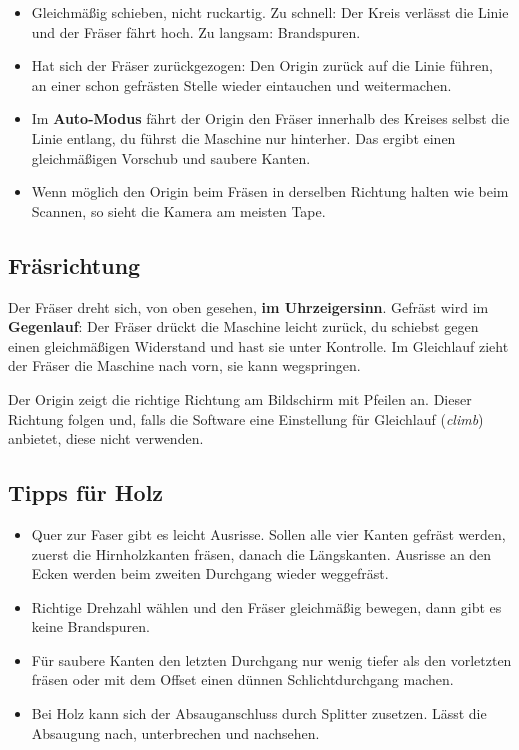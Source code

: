 \documentclass{\basedir/fablab-document}
\begin{document}
	\begin{itemize}
		\item Gleichmäßig schieben, nicht ruckartig. Zu schnell: Der Kreis verlässt die Linie und der Fräser fährt hoch. Zu langsam: Brandspuren.
		\item Hat sich der Fräser zurückgezogen: Den Origin zurück auf die Linie führen, an einer schon gefrästen Stelle wieder eintauchen und weitermachen.
		\item Im \textbf{Auto-Modus} fährt der Origin den Fräser innerhalb des Kreises selbst die Linie entlang, du führst die Maschine nur hinterher. Das ergibt einen gleichmäßigen Vorschub und saubere Kanten.
		\item Wenn möglich den Origin beim Fräsen in derselben Richtung halten wie beim Scannen, so sieht die Kamera am meisten Tape.
	\end{itemize}

	\subsection{Fräsrichtung}
	\label{sec:gegenlauf}
	Der Fräser dreht sich, von oben gesehen, \textbf{im Uhrzeigersinn}. Gefräst wird im \textbf{Gegenlauf}: Der Fräser drückt die Maschine leicht zurück, du schiebst gegen einen gleichmäßigen Widerstand und hast sie unter Kontrolle. Im Gleichlauf zieht der Fräser die Maschine nach vorn, sie kann wegspringen.

	Der Origin zeigt die richtige Richtung am Bildschirm mit Pfeilen an. Dieser Richtung folgen und, falls die Software eine Einstellung für Gleichlauf (\textit{climb}) anbietet, diese nicht verwenden.

	\begin{center}
		
	\end{center}

	\subsection{Tipps für Holz}
	\begin{itemize}
		\item Quer zur Faser gibt es leicht Ausrisse. Sollen alle vier Kanten gefräst werden, zuerst die Hirnholzkanten fräsen, danach die Längskanten. Ausrisse an den Ecken werden beim zweiten Durchgang wieder weggefräst.
		\item Richtige Drehzahl wählen und den Fräser gleichmäßig bewegen, dann gibt es keine Brandspuren.
		\item Für saubere Kanten den letzten Durchgang nur wenig tiefer als den vorletzten fräsen oder mit dem Offset einen dünnen Schlichtdurchgang machen.
		\item Bei Holz kann sich der Absauganschluss durch Splitter zusetzen. Lässt die Absaugung nach, unterbrechen und nachsehen.
	\end{itemize}
\end{document}
